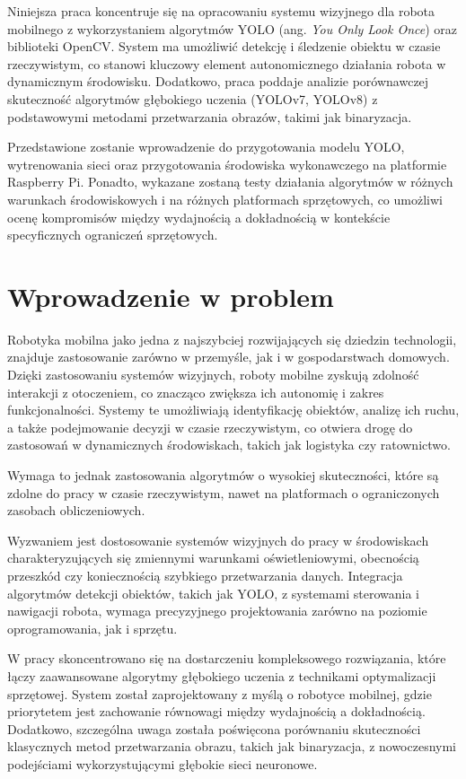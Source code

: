 \documentclass[a4paper,twoside,12pt]{book}
\begin{document}
Niniejsza praca koncentruje się na opracowaniu systemu wizyjnego dla robota mobilnego z wykorzystaniem algorytmów YOLO (ang. \textit{You Only Look Once}) oraz biblioteki OpenCV. System ma umożliwić detekcję i śledzenie obiektu w czasie rzeczywistym, co stanowi kluczowy element autonomicznego działania robota w dynamicznym środowisku. Dodatkowo, praca poddaje analizie porównawczej skuteczność algorytmów głębokiego uczenia (YOLOv7, YOLOv8) z podstawowymi metodami przetwarzania obrazów, takimi jak binaryzacja. 

Przedstawione zostanie wprowadzenie do przygotowania modelu YOLO, wytrenowania sieci oraz przygotowania środowiska wykonawczego na platformie Raspberry Pi. Ponadto, wykazane zostaną testy działania algorytmów w różnych warunkach środowiskowych i na różnych platformach sprzętowych, co umożliwi ocenę kompromisów między wydajnością a dokładnością w kontekście specyficznych ograniczeń sprzętowych.

\newpage

\section{Wprowadzenie w problem}
Robotyka mobilna jako jedna z najszybciej rozwijających się dziedzin technologii, znajduje zastosowanie zarówno w przemyśle, jak i w gospodarstwach domowych. Dzięki zastosowaniu systemów wizyjnych, roboty mobilne zyskują zdolność interakcji z otoczeniem, co znacząco zwiększa ich autonomię i zakres funkcjonalności. Systemy te umożliwiają identyfikację obiektów, analizę ich ruchu, a także podejmowanie decyzji w czasie rzeczywistym, co otwiera drogę do zastosowań w dynamicznych środowiskach, takich jak logistyka czy ratownictwo.

Wymaga to jednak zastosowania algorytmów o wysokiej skuteczności, które są zdolne do pracy w czasie rzeczywistym, nawet na platformach o ograniczonych zasobach obliczeniowych.

Wyzwaniem jest dostosowanie systemów wizyjnych do pracy w środowiskach charakteryzujących się zmiennymi warunkami oświetleniowymi, obecnością przeszkód czy koniecznością szybkiego przetwarzania danych. Integracja algorytmów detekcji obiektów, takich jak YOLO, z systemami sterowania i nawigacji robota, wymaga precyzyjnego projektowania zarówno na poziomie oprogramowania, jak i sprzętu.

W pracy skoncentrowano się na dostarczeniu kompleksowego rozwiązania, które łączy zaawansowane algorytmy głębokiego uczenia z technikami optymalizacji sprzętowej. System został zaprojektowany z myślą o robotyce mobilnej, gdzie priorytetem jest zachowanie równowagi między wydajnością a dokładnością. Dodatkowo, szczególna uwaga została poświęcona porównaniu skuteczności klasycznych metod przetwarzania obrazu, takich jak binaryzacja, z nowoczesnymi podejściami wykorzystującymi głębokie sieci neuronowe.
\end{document}
